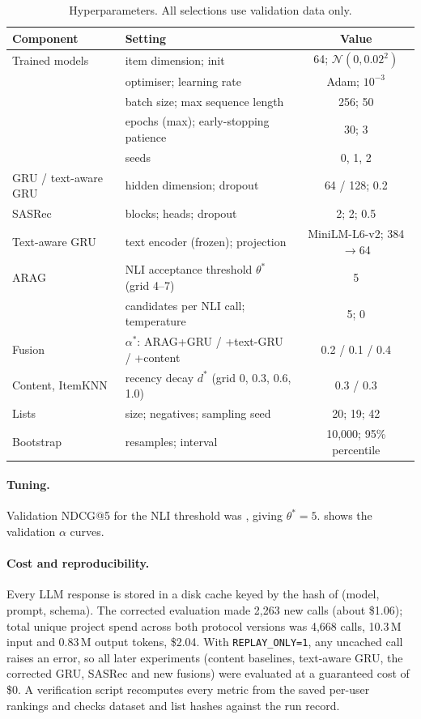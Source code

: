 \documentclass[11pt,a4paper]{article}
\begin{document}
\begin{table}[h]
\centering
\caption{Hyperparameters. All selections use validation data only.}
\label{tab:hparams}
\small
\begin{tabular}{llc}
\toprule
Component & Setting & Value \\
\midrule
Trained models & item dimension; init & 64; $\mathcal{N}(0,0.02^2)$ \\
          & optimiser; learning rate & Adam; $10^{-3}$ \\
          & batch size; max sequence length & 256; 50 \\
          & epochs (max); early-stopping patience & 30; 3 \\
          & seeds & 0, 1, 2 \\
GRU / text-aware GRU & hidden dimension; dropout & 64 / 128; 0.2 \\
SASRec & blocks; heads; dropout & 2; 2; 0.5 \\
Text-aware GRU & text encoder (frozen); projection & MiniLM-L6-v2; 384$\to$64 \\
ARAG & NLI acceptance threshold $\theta^*$ (grid 4--7) & 5 \\
     & candidates per NLI call; temperature & 5; 0 \\
Fusion & $\alpha^*$: ARAG+GRU / +text-GRU / +content & 0.2 / 0.1 / 0.4 \\
Content, ItemKNN & recency decay $d^*$ (grid 0, 0.3, 0.6, 1.0) & 0.3 / 0.3 \\
Lists & size; negatives; sampling seed & 20; 19; 42 \\
Bootstrap & resamples; interval & 10{,}000; 95\% percentile \\
\bottomrule
\end{tabular}
\end{table}

\paragraph{Tuning.} Validation NDCG@5 for the NLI threshold was , giving
$\theta^*=5$.  shows the validation $\alpha$ curves.

\paragraph{Cost and reproducibility.} Every LLM response is stored in a disk cache keyed by the
hash of (model, prompt, schema). The corrected evaluation made 2{,}263 new calls (about
\$1.06); total unique project spend across both protocol versions was 4{,}668 calls, 10.3\,M input
and 0.83\,M output tokens, \$2.04. With \texttt{REPLAY\_ONLY=1}, any uncached call raises an
error, so all later experiments (content baselines, text-aware GRU, the corrected GRU, SASRec
and new fusions) were evaluated at a guaranteed cost of \$0. A verification script recomputes every metric from the
saved per-user rankings and checks dataset and list hashes against the run record.
\end{document}
